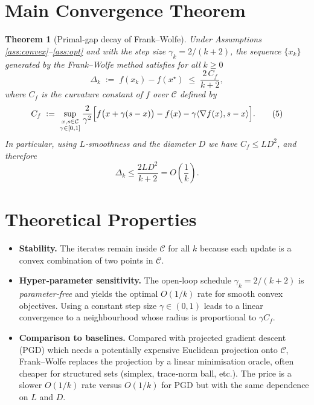\documentclass{article}
\newtheorem{theorem}{Theorem}
\newcommand{\Cset}{\mathcal{C}}
\newcommand{\gap}{\Delta}
\newcommand{\opt}{x^{\star}}
\newcommand{\grad}{\nabla}
\newcommand{\inner}[2]{\langle #1,#2\rangle}
\begin{document}
\section*{Main Convergence Theorem}
\begin{theorem}[Primal‑gap decay of Frank–Wolfe]\label{thm:fw-rate}
Under Assumptions \ref{ass:convex}–\ref{ass:opt} and with the step size $\gamma_{k}=2/(k+2)$,
the sequence $\{x_{k}\}$ generated by the Frank–Wolfe method satisfies for all $k\ge0$
\[
\gap_{k}\;:=\; f(x_{k})-f(\opt)\;\le\;\frac{2\,C_{f}}{k+2},
\tag{4}
\]
where $C_{f}$ is the curvature constant of $f$ over $\Cset$ defined by
\[
C_{f}\;:=\;\sup_{\substack{x,s\in\Cset\\\gamma\in[0,1]}}
\frac{2}{\gamma^{2}}\Bigl[f\bigl(x+\gamma(s-x)\bigr)-f(x)-\gamma\inner{\grad f(x)}{s-x}\Bigr].
\tag{5}
\]
In particular, using $L$‑smoothness and the diameter $D$ we have $C_{f}\le L D^{2}$, and therefore
\[
\gap_{k}\le \frac{2 L D^{2}}{k+2}=O\!\left(\frac{1}{k}\right).
\tag{6}
\]
\end{theorem}

\section*{Theoretical Properties}
\begin{itemize}
\item \textbf{Stability.}  The iterates remain inside $\Cset$ for all $k$ because each update is a convex combination of two points in $\Cset$.
\item \textbf{Hyper‑parameter sensitivity.}  The open‑loop schedule $\gamma_{k}=2/(k+2)$ is \emph{parameter‑free} and yields the optimal $O(1/k)$ rate for smooth convex objectives.  Using a constant step size $\gamma\in(0,1)$ leads to a linear convergence to a neighbourhood whose radius is proportional to $\gamma C_{f}$.
\item \textbf{Comparison to baselines.}  Compared with projected gradient descent (PGD) which needs a potentially expensive Euclidean projection onto $\Cset$, Frank–Wolfe replaces the projection by a linear minimisation oracle, often cheaper for structured sets (simplex, trace‑norm ball, etc.).  The price is a slower $O(1/k)$ rate versus $O(1/k)$ for PGD but with the same dependence on $L$ and $D$.
\end{itemize}
\end{document}
